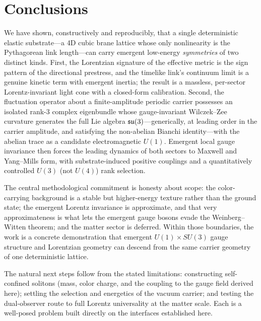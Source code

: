 \section{Conclusions}
\label{sec:conclusions}

We have shown, constructively and reproducibly, that a single deterministic elastic
substrate---a 4D cubic brane lattice whose only nonlinearity is the Pythagorean link
length---can carry emergent low-energy \emph{symmetries} of two distinct kinds. First, the
Lorentzian signature of the effective metric is the sign pattern of the directional prestress,
and the timelike link's continuum limit is a genuine kinetic term with emergent inertia; the
result is a massless, per-sector Lorentz-invariant light cone with a closed-form calibration.
Second, the fluctuation operator about a finite-amplitude periodic carrier possesses an isolated
rank-3 complex eigenbundle whose gauge-invariant Wilczek--Zee curvature generates the full Lie
algebra $\mathfrak{su}(3)$---generically, at leading order in the carrier amplitude, and satisfying the
non-abelian Bianchi identity---with the abelian trace as a candidate electromagnetic $U(1)$.
Emergent local gauge invariance then forces the leading dynamics of both sectors to Maxwell and
Yang--Mills form, with substrate-induced positive couplings and a quantitatively controlled
$U(3)$ (not $U(4)$) rank selection.

The central methodological commitment is honesty about scope: the color-carrying background is a
stable but higher-energy texture rather than the ground state; the emergent Lorentz invariance is
approximate, and that very approximateness is what lets the emergent gauge bosons evade the
Weinberg--Witten theorem; and the matter sector is deferred. Within those boundaries, the work is
a concrete demonstration that emergent $U(1)\times SU(3)$ gauge structure and Lorentzian geometry
can descend from the same carrier geometry of one deterministic lattice.

The natural next steps follow from the stated limitations: constructing self-confined solitons
(mass, color charge, and the coupling to the gauge field derived here); settling the selection and
energetics of the vacuum carrier; and testing the dual-observer route to full Lorentz universality
at the matter scale. Each is a well-posed problem built directly on the interfaces established
here.
